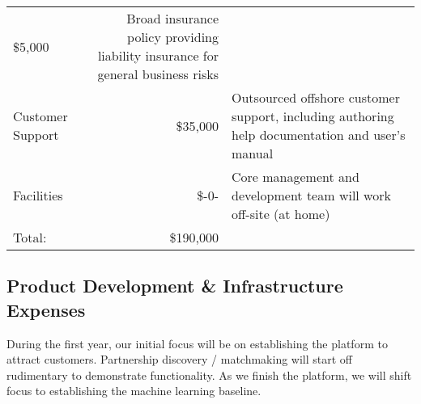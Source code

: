 \documentclass[10pt,openany]{book}
\begin{document}
\begin{longtable}[]{@{}lrl@{}}
\begin{minipage}[t]{0.12\columnwidth}
\$5,000\strut
\end{minipage} & \begin{minipage}[t]{0.48\columnwidth}\raggedright
Broad insurance policy providing liability insurance for general
business risks\strut
\end{minipage}\tabularnewline
\begin{minipage}[t]{0.31\columnwidth}\raggedright
Customer Support\strut
\end{minipage} & \begin{minipage}[t]{0.12\columnwidth}\raggedleft
\$35,000\strut
\end{minipage} & \begin{minipage}[t]{0.48\columnwidth}\raggedright
Outsourced offshore customer support, including authoring help
documentation and user's manual\strut
\end{minipage}\tabularnewline
\begin{minipage}[t]{0.31\columnwidth}\raggedright
Facilities\strut
\end{minipage} & \begin{minipage}[t]{0.12\columnwidth}\raggedleft
\$-0-\strut
\end{minipage} & \begin{minipage}[t]{0.48\columnwidth}\raggedright
Core management and development team will work off-site (at home)\strut
\end{minipage}\tabularnewline
\begin{minipage}[t]{0.31\columnwidth}\raggedright
Total:\strut
\end{minipage} & \begin{minipage}[t]{0.12\columnwidth}\raggedleft
\$190,000\strut
\end{minipage} & \begin{minipage}[t]{0.48\columnwidth}\raggedright
\strut
\end{minipage}\tabularnewline
\bottomrule
\end{longtable}

\hypertarget{product-development-infrastructure-expenses}{%
\subsection{Product Development \& Infrastructure
Expenses}\label{product-development-infrastructure-expenses}}

During the first year, our initial focus will be on establishing the
platform to attract customers. Partnership discovery / matchmaking will
start off rudimentary to demonstrate functionality. As we finish the
platform, we will shift focus to establishing the machine learning
baseline.
\end{document}
